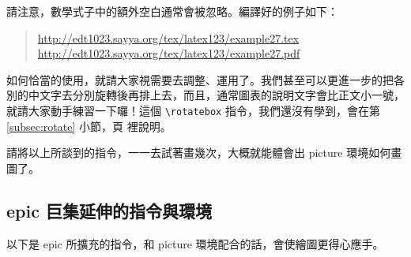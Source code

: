 請注意，數學式子中的額外空白通常會被忽略。編譯好的例子如下：

\begin{quote}
  \url{http://edt1023.sayya.org/tex/latex123/example27.tex}\\
  \url{http://edt1023.sayya.org/tex/latex123/example27.pdf}
\end{quote}

如何恰當的使用，就請大家視需要去調整、運用了。我們甚至可以更進一步的把各別的中文字去分別旋轉後再排上去，而且，通常圖表的說明文字會比正文小一號，就請大家動手練習一下囉！這個 \verb|\rotatebox| 指令，我們還沒有學到，會在第 \ref{subsec:rotate} 小節，頁 \pageref{subsec:rotate} 裡說明。

請將以上所談到的指令，一一去試著畫幾次，大概就能體會出 {\ttfamily picture} 環境如何畫圖了。

\subsection{epic 巨集延伸的指令與環境}

以下是 {\sffamily epic} 所擴充的指令，和 {\ttfamily picture} 環境配合的話，會使繪圖更得心應手。

